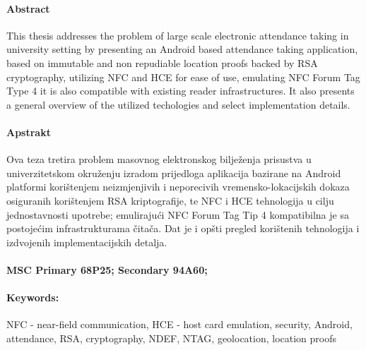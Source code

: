 \paragraph*{Abstract}
This thesis addresses the problem of large scale electronic attendance taking in university setting by presenting an Android based attendance taking application, based on immutable and non repudiable location proofs backed by RSA cryptography, utilizing NFC and HCE for ease of use, emulating NFC Forum Tag Type 4 it is also compatible with existing reader infrastructures. It also presents a general overview of the utilized techologies and select implementation details.

\paragraph*{Apstrakt}
Ova teza tretira problem masovnog elektronskog bilježenja prisustva u univerzitetskom okruženju izradom prijedloga aplikacija bazirane na Android platformi korištenjem neizmjenjivih i neporecivih vremensko-lokacijskih dokaza osiguranih korištenjem RSA kriptografije, te NFC i HCE tehnologija u cilju jednostavnosti upotrebe; emulirajući NFC Forum Tag Tip 4 kompatibilna je sa postojećim infrastrukturama čitača. Dat je i opšti pregled korištenih tehnologija i izdvojenih implementacijskih detalja.

\paragraph*{MSC Primary 68P25; Secondary 94A60;}
\paragraph*{Keywords:} NFC - near-field communication, HCE - host card emulation, security, Android, attendance, RSA, cryptography, NDEF, NTAG, geolocation, location proofs